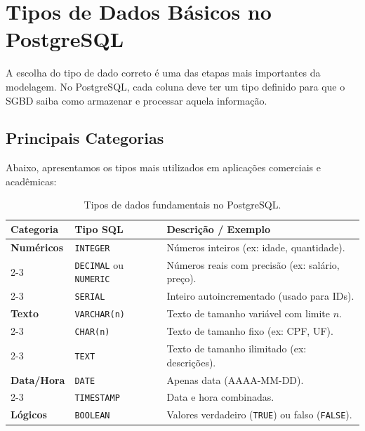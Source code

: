 \section{Tipos de Dados Básicos no PostgreSQL}

A escolha do tipo de dado correto é uma das etapas mais importantes da modelagem. No PostgreSQL, cada coluna deve ter um tipo definido para que o SGBD saiba como armazenar e processar aquela informação.



\subsection{Principais Categorias}

Abaixo, apresentamos os tipos mais utilizados em aplicações comerciais e acadêmicas:

\begin{table}[H]
    \centering
    \renewcommand{\arraystretch}{1.5}
    \begin{tabular}{|l|l|l|}
        \hline
        \textbf{Categoria} & \textbf{Tipo SQL} & \textbf{Descrição / Exemplo} \\ \hline
        \textbf{Numéricos} & \texttt{INTEGER} & Números inteiros (ex: idade, quantidade). \\ \cline{2-3} 
         & \texttt{DECIMAL} ou \texttt{NUMERIC} & Números reais com precisão (ex: salário, preço). \\ \cline{2-3} 
         & \texttt{SERIAL} & Inteiro autoincrementado (usado para IDs). \\ \hline
        \textbf{Texto} & \texttt{VARCHAR(n)} & Texto de tamanho variável com limite $n$. \\ \cline{2-3} 
         & \texttt{CHAR(n)} & Texto de tamanho fixo (ex: CPF, UF). \\ \cline{2-3} 
         & \texttt{TEXT} & Texto de tamanho ilimitado (ex: descrições). \\ \hline
        \textbf{Data/Hora} & \texttt{DATE} & Apenas data (AAAA-MM-DD). \\ \cline{2-3} 
         & \texttt{TIMESTAMP} & Data e hora combinadas. \\ \hline
        \textbf{Lógicos} & \texttt{BOOLEAN} & Valores verdadeiro (\texttt{TRUE}) ou falso (\texttt{FALSE}). \\ \hline
    \end{tabular}
    \caption{Tipos de dados fundamentais no PostgreSQL.}
\end{table}

